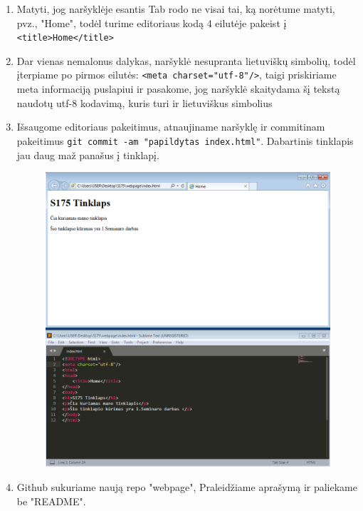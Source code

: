 \documentclass[12pt,a4paper]{article}
\begin{document}
\begin{enumerate}
\item Matyti, jog naršyklėje esantis Tab rodo ne visai tai, ką norėtume matyti, pvz., "Home", todėl turime editoriaus kodą 4 eilutėje pakeist į \colorbox{listinggray}{\lstinline|<title>Home</title>|}

\item Dar vienas nemalonus dalykas, naršyklė nesupranta lietuviškų simbolių, todėl įterpiame  po pirmos eilutės: \colorbox{listinggray}{\lstinline|<meta charset="utf-8"/>|}, taigi priskiriame meta informaciją puslapiui ir pasakome, jog naršyklė skaitydama šį tekstą naudotų utf-8 kodavimą, kuris turi ir lietuviškus simbolius

\item Išsaugome editoriaus pakeitimus, atnaujiname naršyklę ir  commitinam pakeitimus \colorbox{listinggray}{\lstinline|git commit -am "papildytas index.html"|}.  Dabartinis tinklapis jau daug maž panašus į tinklapį.

\begin{figure}[H]
\center
\includegraphics[scale=0.4]{webpage_6.png}
\end{figure}

\item Github sukuriame naują repo "webpage", Praleidžiame aprašymą ir paliekame be "README".


\end{enumerate}
\end{document}
